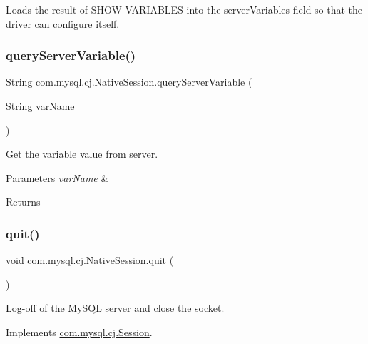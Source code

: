 Loads the result of \textquotesingle{}S\+H\+OW V\+A\+R\+I\+A\+B\+L\+ES\textquotesingle{} into the server\+Variables field so that the driver can configure itself. \mbox{\label{classcom_1_1mysql_1_1cj_1_1_native_session_ad2b81db7dba2a2a485e2a2063599863a}} 
\subsubsection{\texorpdfstring{query\+Server\+Variable()}{queryServerVariable()}}
{\footnotesize\ttfamily String com.\+mysql.\+cj.\+Native\+Session.\+query\+Server\+Variable (\begin{DoxyParamCaption}\item[{String}]{var\+Name }\end{DoxyParamCaption})}

Get the variable value from server.


\begin{DoxyParams}{Parameters}
{\em var\+Name} & \\
\hline
\end{DoxyParams}
\begin{DoxyReturn}{Returns}

\end{DoxyReturn}
\mbox{\label{classcom_1_1mysql_1_1cj_1_1_native_session_a900fc165192f609b5eddb095ee729ae3}} 
\subsubsection{\texorpdfstring{quit()}{quit()}}
{\footnotesize\ttfamily void com.\+mysql.\+cj.\+Native\+Session.\+quit (\begin{DoxyParamCaption}{ }\end{DoxyParamCaption})}

Log-\/off of the My\+S\+QL server and close the socket. 

Implements \mbox{\hyperlink{interfacecom_1_1mysql_1_1cj_1_1_session_af29d73c4e1343fb4bee53b0bac720108}{com.\+mysql.\+cj.\+Session}}.

